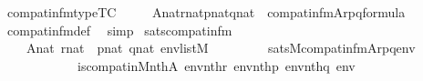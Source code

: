 \begin{isabellebody}
\isanewline
{}\isamarkupfalse%
\ compat{\isacharunderscore}{\kern0pt}in{\isacharunderscore}{\kern0pt}fm{\isacharunderscore}{\kern0pt}type{\isacharbrackleft}{\kern0pt}TC{\isacharbrackright}{\kern0pt}\ {\isacharcolon}{\kern0pt}\ \isanewline
\ \ {\isachardoublequoteopen}{\isasymlbrakk}\ A{\isasymin}nat{\isacharsemicolon}{\kern0pt}r{\isasymin}nat{\isacharsemicolon}{\kern0pt}p{\isasymin}nat{\isacharsemicolon}{\kern0pt}q{\isasymin}nat{\isasymrbrakk}\ {\isasymLongrightarrow}\ compat{\isacharunderscore}{\kern0pt}in{\isacharunderscore}{\kern0pt}fm{\isacharparenleft}{\kern0pt}A{\isacharcomma}{\kern0pt}r{\isacharcomma}{\kern0pt}p{\isacharcomma}{\kern0pt}q{\isacharparenright}{\kern0pt}{\isasymin}formula{\isachardoublequoteclose}\ \isanewline
%
\isadelimproof
\ \ %
\endisadelimproof
%
\isatagproof
{}\isamarkupfalse%
\ compat{\isacharunderscore}{\kern0pt}in{\isacharunderscore}{\kern0pt}fm{\isacharunderscore}{\kern0pt}def\ \isamarkupfalse%
\ simp%
\endisatagproof
{\isafoldproof}%
%
\isadelimproof
\isanewline
%
\endisadelimproof
\isanewline
{}\isamarkupfalse%
\ sats{\isacharunderscore}{\kern0pt}compat{\isacharunderscore}{\kern0pt}in{\isacharunderscore}{\kern0pt}fm{\isacharcolon}{\kern0pt}\isanewline
\ \ \isanewline
\ \ \ \ {\isachardoublequoteopen}A{\isasymin}nat{\isachardoublequoteclose}\ {\isachardoublequoteopen}r{\isasymin}nat{\isachardoublequoteclose}\ \ {\isachardoublequoteopen}p{\isasymin}nat{\isachardoublequoteclose}\ {\isachardoublequoteopen}q{\isasymin}nat{\isachardoublequoteclose}\ {\isachardoublequoteopen}env{\isasymin}list{\isacharparenleft}{\kern0pt}M{\isacharparenright}{\kern0pt}{\isachardoublequoteclose}\ \ \isanewline
\ \ \isanewline
\ \ \ \ {\isachardoublequoteopen}sats{\isacharparenleft}{\kern0pt}M{\isacharcomma}{\kern0pt}compat{\isacharunderscore}{\kern0pt}in{\isacharunderscore}{\kern0pt}fm{\isacharparenleft}{\kern0pt}A{\isacharcomma}{\kern0pt}r{\isacharcomma}{\kern0pt}p{\isacharcomma}{\kern0pt}q{\isacharparenright}{\kern0pt}{\isacharcomma}{\kern0pt}env{\isacharparenright}{\kern0pt}\ {\isasymlongleftrightarrow}\ \isanewline
\ \ \ \ \ \ \ \ \ \ \ \ is{\isacharunderscore}{\kern0pt}compat{\isacharunderscore}{\kern0pt}in{\isacharparenleft}{\kern0pt}{\isacharhash}{\kern0pt}{\isacharhash}{\kern0pt}M{\isacharcomma}{\kern0pt}nth{\isacharparenleft}{\kern0pt}A{\isacharcomma}{\kern0pt}\ env{\isacharparenright}{\kern0pt}{\isacharcomma}{\kern0pt}nth{\isacharparenleft}{\kern0pt}r{\isacharcomma}{\kern0pt}\ env{\isacharparenright}{\kern0pt}{\isacharcomma}{\kern0pt}nth{\isacharparenleft}{\kern0pt}p{\isacharcomma}{\kern0pt}\ env{\isacharparenright}{\kern0pt}{\isacharcomma}{\kern0pt}nth{\isacharparenleft}{\kern0pt}q{\isacharcomma}{\kern0pt}\ env{\isacharparenright}{\kern0pt}{\isacharparenright}{\kern0pt}{\isachardoublequoteclose}\isanewline

\end{isabellebody}
